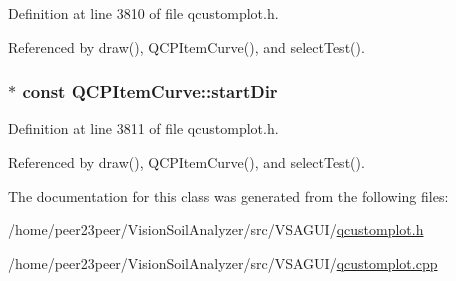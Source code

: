 Definition at line 3810 of file qcustomplot.\+h.



Referenced by draw(), Q\+C\+P\+Item\+Curve(), and select\+Test().

\hypertarget{class_q_c_p_item_curve_aa124bf66c09cc51c627fb49db8bf8a7b}{}
\subsubsection[{start\+Dir}]{$\ast$ const Q\+C\+P\+Item\+Curve\+::start\+Dir}\label{class_q_c_p_item_curve_aa124bf66c09cc51c627fb49db8bf8a7b}


Definition at line 3811 of file qcustomplot.\+h.



Referenced by draw(), Q\+C\+P\+Item\+Curve(), and select\+Test().



The documentation for this class was generated from the following files\+:\begin{DoxyCompactItemize}
\item 
/home/peer23peer/\+Vision\+Soil\+Analyzer/src/\+V\+S\+A\+G\+U\+I/\hyperlink{qcustomplot_8h}{qcustomplot.\+h}\item 
/home/peer23peer/\+Vision\+Soil\+Analyzer/src/\+V\+S\+A\+G\+U\+I/\hyperlink{qcustomplot_8cpp}{qcustomplot.\+cpp}\end{DoxyCompactItemize}
